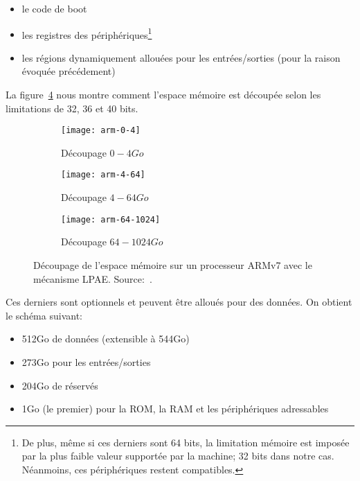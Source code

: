     \begin{itemize}
      \item le code de boot
      \item les registres des périphériques\footnote{De plus, même si ces
        derniers sont 64 bits, la limitation mémoire est imposée par la plus
        faible valeur supportée par la machine; 32 bits dans notre
        cas. Néanmoins, ces périphériques restent compatibles.}
      \item les régions dynamiquement allouées pour les entrées/sorties (pour la
        raison évoquée précédement)
    \end{itemize}

    La figure~\ref{fig:arm-0-1024} nous montre comment l'espace mémoire est
    découpée selon les limitations de 32, 36 et 40 bits.

    \begin{figure}[h]
      \begin{subfigure}[b]{0.37\textwidth}
        \texttt{[image: arm-0-4]}
        \caption{Découpage $0-4Go$}
        \label{fig:arm-0-4}
      \end{subfigure}
      \begin{subfigure}[b]{0.37\textwidth}
        \texttt{[image: arm-4-64]}
        \caption{Découpage $4-64Go$}
        \label{fig:arm-4-64}
      \end{subfigure}
      \begin{subfigure}[b]{0.23\textwidth}
        \texttt{[image: arm-64-1024]}
        \caption{Découpage $64-1024Go$}
        \label{fig:arm-64-1024}
      \end{subfigure}
      \caption{Découpage de l'espace mémoire sur un processeur ARMv7 avec le
        mécanisme LPAE. Source:~\citeauthor{arm2012principles}.}
      \label{fig:arm-0-1024}
    \end{figure}

    Ces derniers sont optionnels et peuvent être alloués pour des données. On
    obtient le schéma suivant:

    \begin{itemize}
      \item 512Go de données (extensible à 544Go)
      \item 273Go pour les entrées/sorties
      \item 204Go de réservés
      \item 1Go (le premier) pour la ROM, la RAM et les périphériques
        adressables
    \end{itemize}

